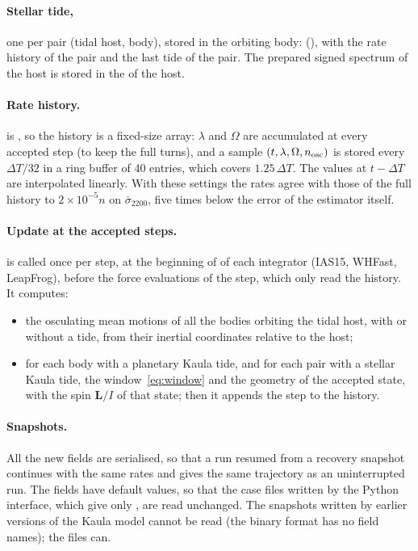 \paragraph{Stellar tide,} one per pair (tidal host, body), stored in the orbiting body:  (), with the rate history of the pair and the last tide of the pair. The prepared signed spectrum of the host is stored in the  of the host.

\paragraph{Rate history.}  is , so the history is a fixed-size array: $\lambda$ and $\Omega$ are accumulated at every accepted step (to keep the full turns), and a sample $(t,\lambda,\Omega,n_{\rm osc})$ is stored every $\Delta T/32$ in a ring buffer of 40 entries, which covers $1.25\,\Delta T$. The values at $t-\Delta T$ are interpolated linearly. With these settings the rates agree with those of the full history to $2\times10^{-5}n$ on $\bar\sigma_{2200}$, five times below the error of the estimator itself.

\paragraph{Update at the accepted steps.}  is called once per step, at the beginning of  of each integrator (IAS15, WHFast, LeapFrog), before the force evaluations of the step, which only read the history. It computes:
\begin{itemize}
  \item the osculating mean motions of all the bodies orbiting the tidal host, with or without a tide, from their inertial coordinates relative to the host;
  \item for each body with a planetary Kaula tide, and for each pair with a stellar Kaula tide, the window~\eqref{eq:window} and the geometry of the accepted state, with the spin $\mathbf L/I$ of that state; then it appends the step to the history.
\end{itemize}

\paragraph{Snapshots.} All the new fields are serialised, so that a run resumed from a recovery snapshot continues with the same rates and gives the same trajectory as an uninterrupted run. The fields have default values, so that the case files written by the Python interface, which give only , are read unchanged. The  snapshots written by earlier versions of the Kaula model cannot be read (the binary format has no field names); the  files can.

